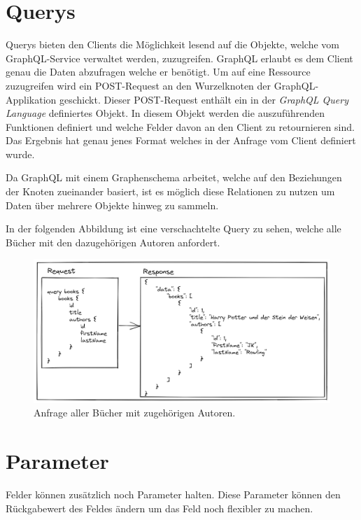 
\section{Querys}

Querys bieten den Clients die Möglichkeit lesend auf die Objekte, welche vom GraphQL-Service verwaltet werden, zuzugreifen.
GraphQL erlaubt es dem Client genau die Daten abzufragen welche er benötigt.
Um auf eine Ressource zuzugreifen wird ein POST-Request an den Wurzelknoten der GraphQL-Applikation geschickt.
Dieser POST-Request enthält ein in der \textit{GraphQL Query Language} definiertes Objekt.
In diesem Objekt werden die auszuführenden Funktionen definiert und welche Felder davon an den Client zu retournieren sind.
Das Ergebnis hat genau jenes Format welches in der Anfrage vom Client definiert wurde.
\cite[S.40-41]{kress2020graphql}

Da GraphQL mit einem Graphenschema arbeitet, welche auf den Beziehungen der Knoten zueinander basiert, ist es möglich diese Relationen zu nutzen um Daten über mehrere Objekte hinweg zu sammeln.
\newline


In der folgenden Abbildung ist eine verschachtelte Query zu sehen, welche alle Bücher mit den dazugehörigen Autoren anfordert.

\begin{figure}[H]
    \includegraphics[width=\textwidth]{pics/query_book_with_result.png}
    \caption{Anfrage aller Bücher mit zugehörigen Autoren.}
\end{figure}

\section{Parameter}
Felder können zusätzlich noch Parameter halten.
Diese Parameter können den Rückgabewert des Feldes ändern um das Feld noch flexibler zu machen.
\newline


